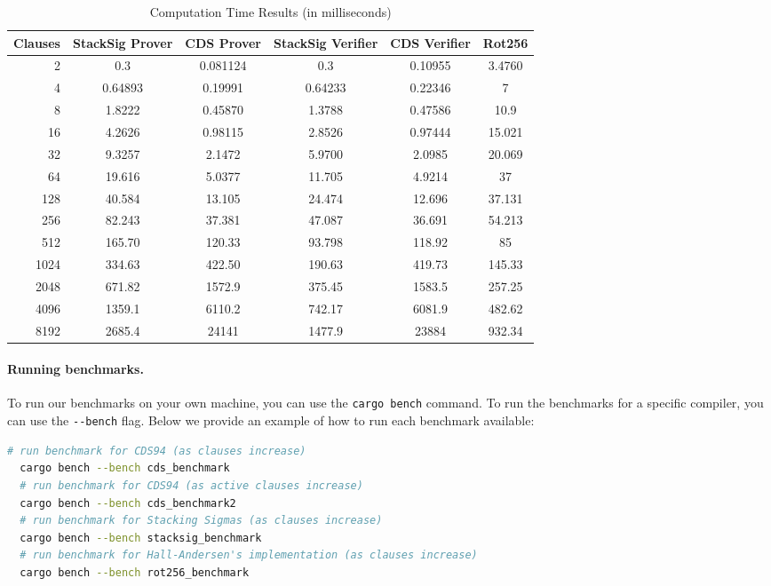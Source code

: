 \begin{table}[H]
\centering
\caption{Computation Time Results (in milliseconds)}
\label{tab:comp-time}
\begin{tabular}{rccccc}
\toprule
\textbf{Clauses} & \textbf{StackSig Prover} & \textbf{CDS Prover} & \textbf{StackSig Verifier} & \textbf{CDS Verifier} & \textbf{Rot256} \\
\midrule
2 & 0.3 & 0.081124 & 0.3 & 0.10955 & 3.4760 \\
4 & 0.64893 & 0.19991 & 0.64233 & 0.22346 & 7 \\
8 & 1.8222 & 0.45870 & 1.3788 & 0.47586 & 10.9 \\
16 & 4.2626 & 0.98115 & 2.8526 & 0.97444 & 15.021 \\
32 & 9.3257 & 2.1472 & 5.9700 & 2.0985 & 20.069 \\
64 & 19.616 & 5.0377 & 11.705 & 4.9214 & 37 \\
128 & 40.584 & 13.105 & 24.474 & 12.696 & 37.131 \\
256 & 82.243 & 37.381 & 47.087 & 36.691 & 54.213 \\
512 & 165.70 & 120.33 & 93.798 & 118.92 & 85 \\
1024 & 334.63 & 422.50 & 190.63 & 419.73 & 145.33 \\
2048 & 671.82 & 1572.9 & 375.45 & 1583.5 & 257.25 \\
4096 & 1359.1 & 6110.2 & 742.17 & 6081.9 & 482.62 \\
8192 & 2685.4 & 24141 & 1477.9 & 23884 & 932.34 \\
\bottomrule
\end{tabular}
\end{table}

\paragraph{Running benchmarks.} To run our benchmarks on your own machine, you can 
use the \texttt{cargo bench} command. To run the benchmarks for a specific compiler,
you can use the \texttt{{-}{-}bench} flag. Below we provide an example of how to run
each benchmark available:
\begin{lstlisting}[language=bash]
  # run benchmark for CDS94 (as clauses increase)
  cargo bench --bench cds_benchmark 
  # run benchmark for CDS94 (as active clauses increase)
  cargo bench --bench cds_benchmark2 
  # run benchmark for Stacking Sigmas (as clauses increase)
  cargo bench --bench stacksig_benchmark 
  # run benchmark for Hall-Andersen's implementation (as clauses increase)
  cargo bench --bench rot256_benchmark
\end{lstlisting}

